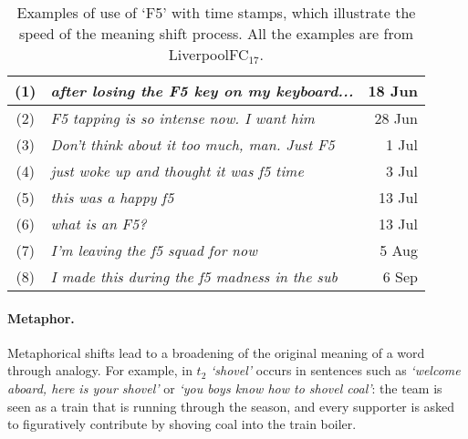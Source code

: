 \begin{table}[t]\centering   \small
    \begin{tabular}{@{}cp{5.5cm}r@{}}
        \hline
        (1) & \em after losing the F5 key on my keyboard... & 18 Jun\\\hline
        (2) & \em F5 tapping is so intense now. I want him & 28 Jun\\\hline
        (3) & \em Don't think about it too much, man. Just F5 & 1 Jul\\\hline
        (4) & \em just woke up and thought it was f5 time & 3 Jul\\\hline
        (5) & \em this was a happy f5 & 13 Jul\\\hline
        (6) & \em what is an F5? & 13 Jul \\\hline
        (7) & \em I'm leaving the f5 squad for now & 5 Aug\\\hline
        (8) & \em I made this during the f5 madness in the sub & 6 Sep\\\hline      
    \end{tabular}
    \caption{Examples of use of `F5' with time stamps, which illustrate the speed of the meaning shift process. All the examples are from LiverpoolFC$_{17}$.}
     \label{table:f5}
\end{table}

\paragraph{Metaphor.}
Metaphorical shifts lead to a broadening of the original meaning of a
word through analogy.
For example, in $t_2$ {\em `shovel'} occurs in sentences such as \textit{`welcome aboard, here is your shovel'} or 
\textit{`you boys know how to shovel coal'}: the team is seen as a train that is running through the season, and every supporter is asked to figuratively contribute by shoving coal into the train boiler. 


